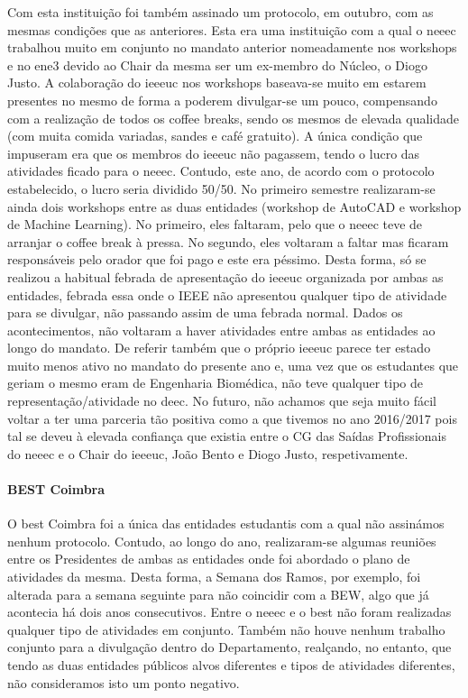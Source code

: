 Com esta instituição foi também assinado um protocolo, em outubro, com as mesmas condições que as anteriores. Esta era uma instituição com a qual o \acrshort{neeec} trabalhou muito em conjunto no mandato anterior nomeadamente nos workshops e no \acrshort{ene3} devido ao Chair da mesma ser um ex-membro do Núcleo, o Diogo Justo. A colaboração do \acrshort{ieeeuc} nos workshops baseava-se muito em estarem presentes no mesmo de forma a poderem divulgar-se um pouco, compensando com a realização de todos os coffee breaks, sendo os mesmos de elevada qualidade (com muita comida variadas, sandes e café gratuito). A única condição que impuseram era que os membros do \acrshort{ieeeuc} não pagassem, tendo o lucro das atividades ficado para o \acrshort{neeec}. Contudo, este ano, de acordo com o protocolo estabelecido, o lucro seria dividido 50/50. No primeiro semestre realizaram-se ainda dois workshops entre as duas entidades (workshop de AutoCAD e workshop de Machine Learning). No primeiro, eles faltaram, pelo que o \acrshort{neeec} teve de arranjar o coffee break à pressa. No segundo, eles voltaram a faltar mas ficaram responsáveis pelo orador que foi pago e este era péssimo. Desta forma, só se realizou a habitual febrada de apresentação do \acrshort{ieeeuc} organizada por ambas as entidades, febrada essa onde o IEEE não apresentou qualquer tipo de atividade para se divulgar, não passando assim de uma febrada normal. Dados os acontecimentos, não voltaram a haver atividades entre ambas as entidades ao longo do mandato. De referir também que o próprio \acrshort{ieeeuc} parece ter estado muito menos ativo no mandato do presente ano e, uma vez que os estudantes que geriam o mesmo eram de Engenharia Biomédica, não teve qualquer tipo de representação/atividade no \acrshort{deec}. No futuro, não achamos que seja muito fácil voltar a ter uma parceria tão positiva como a que tivemos no ano 2016/2017 pois tal se deveu à elevada confiança que existia entre o CG das Saídas Profissionais do \acrshort{neeec} e o Chair do \acrshort{ieeeuc}, João Bento e Diogo Justo, respetivamente.

\paragraph{BEST Coimbra}

O \acrfull{best} Coimbra foi a única das entidades estudantis com a qual não assinámos nenhum protocolo. Contudo, ao longo do ano, realizaram-se algumas reuniões entre os Presidentes de ambas as entidades onde foi abordado o plano de atividades da mesma. Desta forma, a Semana dos Ramos, por exemplo, foi alterada para a semana seguinte para não coincidir com a BEW, algo que já acontecia há dois anos consecutivos. Entre o \acrshort{neeec} e o \acrshort{best} não foram realizadas qualquer tipo de atividades em conjunto. Também não houve nenhum trabalho conjunto para a divulgação dentro do Departamento, realçando, no entanto, que tendo as duas entidades públicos alvos diferentes e tipos de atividades diferentes, não consideramos isto um ponto negativo.

